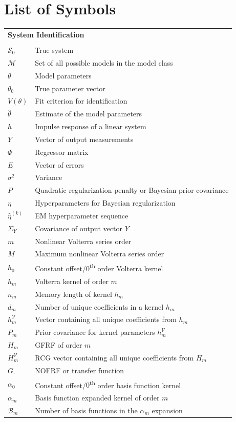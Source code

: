 \documentclass[11pt,twoside]{report}
\begin{document}
\chapter*{List of Symbols}
\thispagestyle{plain}
\begin{longtable}{p{} p{}}
\multicolumn{2}{l}{\textbf{System Identification}} \\ %
\\
$\mathcal{S}_0$ & True system \\
$\mathcal{M}$ & Set of all possible models in the model class \\
$\theta$ & Model parameters \\ 
$\theta_0$ & True parameter vector \\
$V(\theta)$ & Fit criterion for identification \\
$\hat{\theta}$ & Estimate of the model parameters \\
$h$ & Impulse response of a linear system \\
$Y$ & Vector of output measurements \\
$\Phi$ & Regressor matrix \\
$E$ & Vector of errors \\
$\sigma^2$ & Variance\\
$P$ & Quadratic regularization penalty or Bayesian prior covariance \\
$\eta$ & Hyperparameters for Bayesian regularization \\
$\hat{\eta}^{(k)}$ & EM hyperparameter sequence \\
$\Sigma_Y$ & Covariance of output vector $Y$ \\
$m$ & Nonlinear Volterra series order \\
$M$ & Maximum nonlinear Volterra series order \\
$h_0$ & Constant offset/$0$\textsuperscript{th} order Volterra kernel \\
$h_m$ & Volterra kernel of order $m$ \\
$n_m$ & Memory length of kernel $h_m$ \\
$d_m$ & Number of unique coefficients in a kernel $h_m$ \\
$h_m^\mathcal{V}$ & Vector containing all unique coefficients from $h_m$ \\
$P_m$ & Prior covariance for kernel parameters $h_m^\mathcal{V}$ \\
$H_m$ & GFRF of order $m$ \\
$H_m^\mathcal{V}$ & RCG vector containing all unique coefficients from $H_m$ \\
$G_{\cdot}$ & NOFRF or transfer function \\
$\alpha_0$ & Constant offset/$0$\textsuperscript{th} order basis function kernel \\
$\alpha_m$ & Basis function expanded kernel of order $m$ \\
$\mathcal{B}_m$ & Number of basis functions in the $\alpha_m$ expansion 
\end{longtable}
\thispagestyle{plain}
\end{document}
